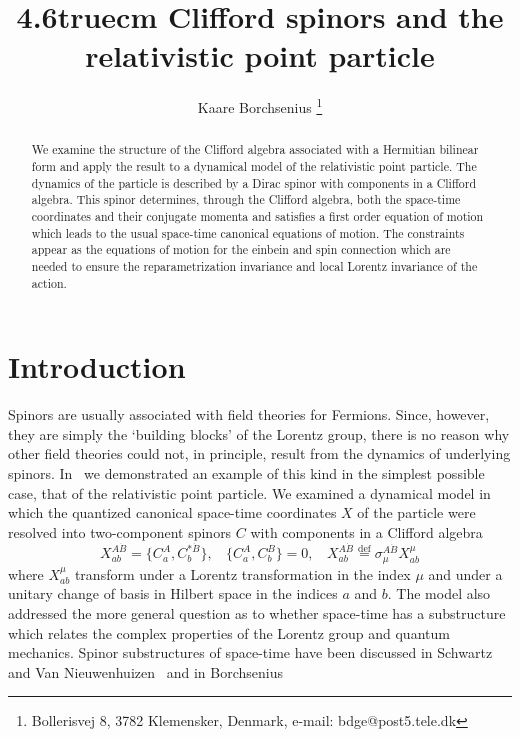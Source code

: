 \documentclass[a4paper,a4paper]{article}
\title{\vglue4.6truecm
Clifford spinors and the relativistic point particle}
\author{Kaare Borchsenius
\thanks{Bollerisvej 8, 3782 Klemensker, Denmark,
e-mail: bdge@post5.tele.dk}}
\date{}
\begin{document}
\maketitle
\begin{abstract}
We examine the structure of the Clifford algebra associated with a Hermitian
bilinear form and apply the result to a dynamical model of the relativistic
point particle. The dynamics of the particle is described by a Dirac spinor with
components in a Clifford algebra. This spinor determines, through the Clifford
algebra, both the space-time coordinates and their conjugate momenta and
satisfies a first order equation of motion which leads to the usual space-time
canonical equations of motion. The constraints appear as the equations of motion
for the einbein and spin connection which are needed to ensure the
reparametrization invariance and local Lorentz invariance of the action. 
\end{abstract}
\pagebreak
\section{Introduction}
Spinors are usually associated with field theories for Fermions. Since, however,
they are simply the `building blocks' of the Lorentz group, there is no reason
why other field theories could not, in principle, result from the dynamics of
underlying spinors. In~\cite{borch4} we demonstrated an example of this kind in
the simplest possible case, that of the relativistic point particle. We examined
a dynamical model in which the quantized canonical space-time coordinates $X$
of the particle were resolved into two-component spinors $C$ with components in
a Clifford algebra
\begin{equation} 
X^{A\dot{B}}_{ab} = \{ C^{A}_{a},C^{*\dot{B}}_{b} \}, \ \ \ \ \{
C^{A}_{a},C^{B}_{b} \}=0 ,\ \ \ \ X^{A\dot{B}}_{ab} \stackrel{\mathrm{def}}{=}
\sigma_{\mu}^{A\dot{B}}X^{\mu}_{ab}
\label{a1}
\end{equation}
where $X^{\mu}_{ab}$ transform under a Lorentz transformation in the index $\mu$
and under a unitary change of basis in Hilbert space in the indices $a$ and
$b$. The model also addressed the more general question as to whether space-time
has a substructure which relates the complex properties of the Lorentz group
and quantum mechanics. Spinor substructures of space-time have been discussed in
Schwartz and Van Nieuwenhuizen~\cite{schwartz} and in
Borchsenius~\cite{borch1,borch2,borch3} 
 
\end{document}
